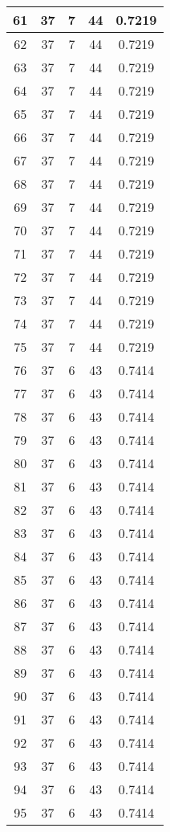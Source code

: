 \documentclass[letterpaper, 12pt]{article}
\begin{document}
\begin{longtable}{|c|c|c|c|c|}
\hline
61 & 37 & 7 & 44 & 0.7219 \\
\hline
62 & 37 & 7 & 44 & 0.7219 \\
\hline
63 & 37 & 7 & 44 & 0.7219 \\
\hline
64 & 37 & 7 & 44 & 0.7219 \\
\hline
65 & 37 & 7 & 44 & 0.7219 \\
\hline
66 & 37 & 7 & 44 & 0.7219 \\
\hline
67 & 37 & 7 & 44 & 0.7219 \\
\hline
68 & 37 & 7 & 44 & 0.7219 \\
\hline
69 & 37 & 7 & 44 & 0.7219 \\
\hline
70 & 37 & 7 & 44 & 0.7219 \\
\hline
71 & 37 & 7 & 44 & 0.7219 \\
\hline
72 & 37 & 7 & 44 & 0.7219 \\
\hline
73 & 37 & 7 & 44 & 0.7219 \\
\hline
74 & 37 & 7 & 44 & 0.7219 \\
\hline
75 & 37 & 7 & 44 & 0.7219 \\
\hline
76 & 37 & 6 & 43 & 0.7414 \\
\hline
77 & 37 & 6 & 43 & 0.7414 \\
\hline
78 & 37 & 6 & 43 & 0.7414 \\
\hline
79 & 37 & 6 & 43 & 0.7414 \\
\hline
80 & 37 & 6 & 43 & 0.7414 \\
\hline
81 & 37 & 6 & 43 & 0.7414 \\
\hline
82 & 37 & 6 & 43 & 0.7414 \\
\hline
83 & 37 & 6 & 43 & 0.7414 \\
\hline
84 & 37 & 6 & 43 & 0.7414 \\
\hline
85 & 37 & 6 & 43 & 0.7414 \\
\hline
86 & 37 & 6 & 43 & 0.7414 \\
\hline
87 & 37 & 6 & 43 & 0.7414 \\
\hline
88 & 37 & 6 & 43 & 0.7414 \\
\hline
89 & 37 & 6 & 43 & 0.7414 \\
\hline
90 & 37 & 6 & 43 & 0.7414 \\
\hline
91 & 37 & 6 & 43 & 0.7414 \\
\hline
92 & 37 & 6 & 43 & 0.7414 \\
\hline
93 & 37 & 6 & 43 & 0.7414 \\
\hline
94 & 37 & 6 & 43 & 0.7414 \\
\hline
95 & 37 & 6 & 43 & 0.7414 \\

\end{longtable}
\end{document}
